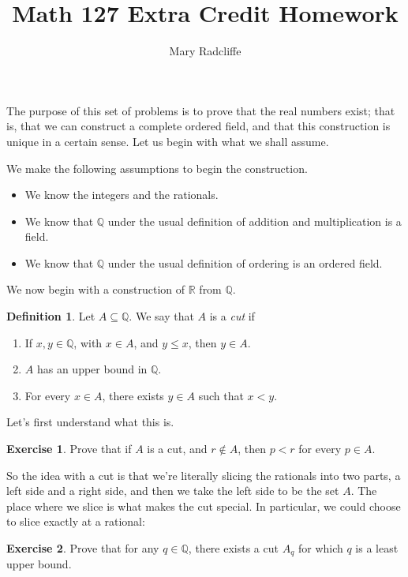\documentclass{article}
\theoremstyle{definition}
\newtheorem{definition}{Definition}
\newtheorem{exercise}{Exercise}
\newcommand{\R}{\mathbb{R}}
\newcommand{\Q}{\mathbb{Q}}
\begin{document}
\title{Math 127 Extra Credit Homework}
\author{Mary Radcliffe}
\maketitle

The purpose of this set of problems is to prove that the real numbers exist; that is, that we can construct a complete ordered field, and that this construction is unique in a certain sense. Let us begin with what we shall assume.

We make the following assumptions to begin the construction.
\begin{itemize}
\item We know the integers and the rationals.
\item We know that $\Q$ under the usual definition of addition and multiplication is a field.
\item We know that $\Q$ under the usual definition of ordering is an ordered field.
\end{itemize}

We now begin with a construction of $\R$ from $\Q$.

\begin{definition}
Let $A\subseteq \Q$. We say that $A$ is a {\it cut} if\begin{enumerate}
\item If $x, y\in \Q$, with $x\in A$, and $y\leq x$, then $y\in A$.
\item $A$ has an upper bound in $\Q$.
\item For every $x\in A$, there exists $y\in A$ such that $x<y$.
\end{enumerate}
\end{definition}

Let's first understand what this is.
\begin{exercise}
Prove that if $A$ is a cut, and $r\notin A$, then $p<r$ for every $p\in A$.
\end{exercise}

So the idea with a cut is that we're literally slicing the rationals into two parts, a left side and a right side, and then we take the left side to be the set $A$. The place where we slice is what makes the cut special. In particular, we could choose to slice exactly at a rational:

\begin{exercise}\label{ratcuts}
Prove that for any $q\in \Q$, there exists a cut $A_q$ for which $q$ is a least upper bound.
\end{exercise}
\end{document}

